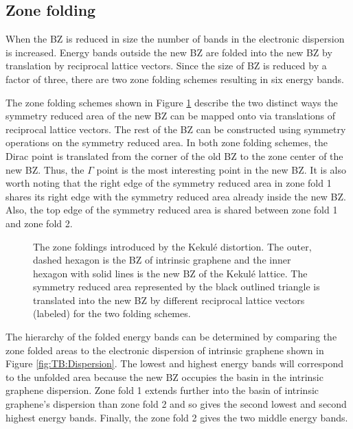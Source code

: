 \subsection{Zone folding}
When the BZ is reduced in size the number of bands in the electronic dispersion is increased.
Energy bands outside the new BZ are folded into the new BZ by translation by reciprocal lattice vectors.
Since the size of BZ is reduced by a factor of three, there are two zone folding schemes resulting in six energy bands.

The zone folding schemes shown in Figure \ref{fig:kek:folding} describe the two distinct ways the symmetry reduced area of the new BZ can be mapped onto via translations of reciprocal lattice vectors.
The rest of the BZ can be constructed using symmetry operations on the symmetry reduced area.
In both zone folding schemes, the Dirac point is translated from the corner of the old BZ to the zone center of the new BZ.
Thus, the $\Gamma$ point is the most interesting point in the new BZ.
It is also worth noting that the right edge of the symmetry reduced area in zone fold 1 shares its right edge with the symmetry reduced area already inside the new BZ.
Also, the top edge of the symmetry reduced area is shared between zone fold 1 and zone fold 2.

\begin{figure}
	\begin{center}
	
	\end{center}
	\caption[The zone foldings introduced by the Kekul\'e distortion]{\label{fig:kek:folding}
		The zone foldings introduced by the Kekul\'e distortion.
		The outer, dashed hexagon is the BZ of intrinsic graphene and the inner hexagon with solid lines is the new BZ of the Kekul\'e lattice.
		The symmetry reduced area represented by the black outlined triangle is translated into the new BZ by different reciprocal lattice vectors (labeled) for the two folding schemes.
		}
\end{figure}

The hierarchy of the folded energy bands can be determined by comparing the zone folded areas to the electronic dispersion of intrinsic graphene shown in Figure \ref{fig:TB:Dispersion}.
The lowest and highest energy bands will correspond to the unfolded area because the new BZ occupies the basin in the intrinsic graphene dispersion.
Zone fold 1 extends further into the basin of intrinsic graphene's dispersion than zone fold 2 and so gives the second lowest and second highest energy bands.
Finally, the zone fold 2 gives the two middle energy bands.

